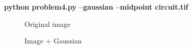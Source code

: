 \pagebreak
\begin{minipage}{\textwidth}
\textbf{python problem4.py --gaussian --midpoint circuit.tif} \\
\end{minipage}

\begin{figure}[!htb]\centering
    \begin{minipage}{0.45\textwidth}
        \caption{\small{Original image}}
    \end{minipage}
    \begin{minipage}{0.45\textwidth}
        \caption{\small{Image + Gaussian}}
    \end{minipage}
\end{figure}

